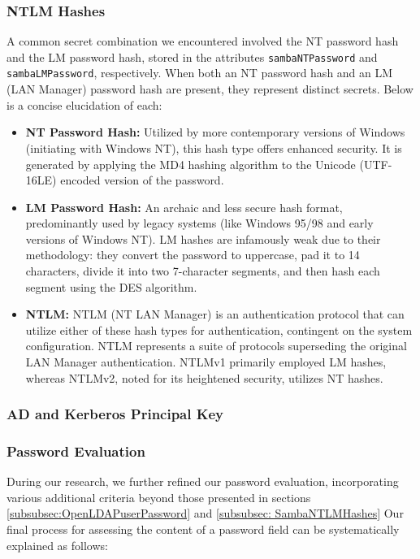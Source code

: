 \subsubsection{NTLM Hashes}

A common secret combination we encountered involved the NT password hash and the LM password hash, stored in the attributes \texttt{sambaNTPassword} and \texttt{sambaLMPassword}, respectively. When both an NT password hash and an LM (LAN Manager) password hash are present, they represent distinct secrets. Below is a concise elucidation of each:

\begin{itemize}
    \item \textbf{NT Password Hash:} Utilized by more contemporary versions of Windows (initiating with Windows NT), this hash type offers enhanced security. It is generated by applying the MD4 hashing algorithm to the Unicode (UTF-16LE) encoded version of the password.
    
    \item \textbf{LM Password Hash:} An archaic and less secure hash format, predominantly used by legacy systems (like Windows 95/98 and early versions of Windows NT). LM hashes are infamously weak due to their methodology: they convert the password to uppercase, pad it to 14 characters, divide it into two 7-character segments, and then hash each segment using the DES algorithm.
    
    \item \textbf{NTLM:} NTLM (NT LAN Manager) is an authentication protocol that can utilize either of these hash types for authentication, contingent on the system configuration. NTLM represents a suite of protocols superseding the original LAN Manager authentication. NTLMv1 primarily employed LM hashes, whereas NTLMv2, noted for its heightened security, utilizes NT hashes.
\end{itemize}

\subsubsection{AD and Kerberos Principal Key}


\subsubsection{Password Evaluation}

During our research, we further refined our password evaluation, incorporating various additional criteria beyond those presented in sections \ref{subsubsec:OpenLDAPuserPassword} and \ref{subsubsec: SambaNTLMHashes} Our final process for assessing the content of a password field can be systematically explained as follows:

